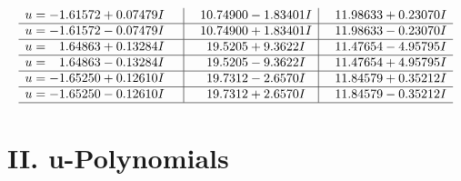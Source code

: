 \documentclass[1p]{elsarticle_modified}
\theoremstyle{definition}
\begin{document}
$$\begin{array}{c|c|c}
\begin{aligned}
u &= -1.61572 + 0.07479 I\end{aligned}
 & \phantom{-}10.74900 - 1.83401 I & \phantom{-}11.98633 + 0.23070 I \\ \hline\begin{aligned}
u &= -1.61572 - 0.07479 I\end{aligned}
 & \phantom{-}10.74900 + 1.83401 I & \phantom{-}11.98633 - 0.23070 I \\ \hline\begin{aligned}
u &= \phantom{-}1.64863 + 0.13284 I\end{aligned}
 & \phantom{-}19.5205 + 9.3622 I & \phantom{-}11.47654 - 4.95795 I \\ \hline\begin{aligned}
u &= \phantom{-}1.64863 - 0.13284 I\end{aligned}
 & \phantom{-}19.5205 - 9.3622 I & \phantom{-}11.47654 + 4.95795 I \\ \hline\begin{aligned}
u &= -1.65250 + 0.12610 I\end{aligned}
 & \phantom{-}19.7312 - 2.6570 I & \phantom{-}11.84579 + 0.35212 I \\ \hline\begin{aligned}
u &= -1.65250 - 0.12610 I\end{aligned}
 & \phantom{-}19.7312 + 2.6570 I & \phantom{-}11.84579 - 0.35212 I\\
 \hline 
 \end{array}$$\newpage
\newpage\renewcommand{\arraystretch}{1}
\centering \section*{ II. u-Polynomials}
\end{document}
